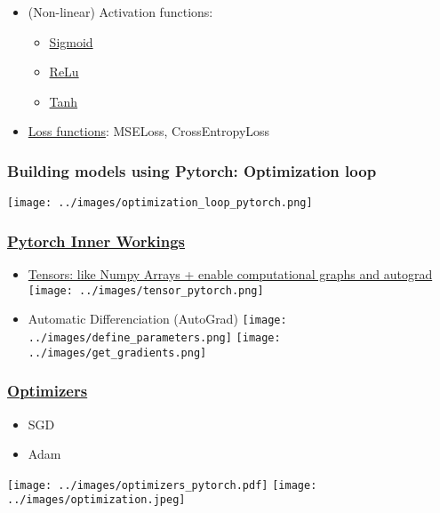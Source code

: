 \begin{frame}[fragile]
\begin{itemize}
      \item (Non-linear) Activation functions:
      \begin{itemize}
         \item \href{https://pytorch.org/docs/stable/generated/torch.nn.Sigmoid.html}{Sigmoid}
         \item \href{https://pytorch.org/docs/stable/generated/torch.nn.ReLU.html}{ReLu}
         \item \href{https://pytorch.org/docs/stable/generated/torch.nn.Tanh.html#torch.nn.Tanh}{Tanh}
      \end{itemize}

      \item \href{https://pytorch.org/docs/stable/nn.html#loss-functions}{Loss functions}: MSELoss, CrossEntropyLoss
   \end{itemize}
\end{frame}

\begin{frame}[fragile]
   \frametitle{Building models using Pytorch: Optimization loop}
   \begin{center}
      \texttt{[image: ../images/optimization\_loop\_pytorch.png]}
   \end{center}
\end{frame}


\begin{frame}[fragile]
   \frametitle{\href{https://pytorch.org/tutorials/beginner/basics/intro.html}{Pytorch Inner Workings}}
   \begin{itemize}
      \item \href{https://pytorch.org/tutorials/beginner/basics/tensorqs_tutorial.html}{Tensors: like Numpy Arrays + enable computational graphs and autograd}\\
      \texttt{[image: ../images/tensor\_pytorch.png]}
      \item Automatic Differenciation (AutoGrad)
      \texttt{[image: ../images/define\_parameters.png]}
      \texttt{[image: ../images/get\_gradients.png]}
   \end{itemize}
\end{frame}

\begin{frame}[fragile]
   \frametitle{\href{https://pytorch.org/docs/stable/optim.html}{Optimizers}}
   \begin{itemize}
         \item SGD
         \item Adam
   \end{itemize}
   \texttt{[image: ../images/optimizers\_pytorch.pdf]}
   \texttt{[image: ../images/optimization.jpeg]}
\end{frame}


